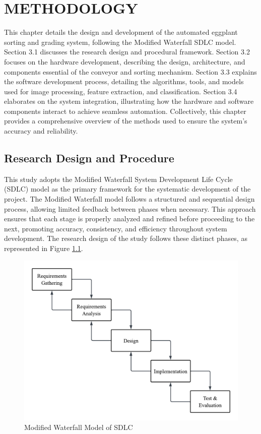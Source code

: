 
\chapter{METHODOLOGY}
{\baselineskip

This chapter details the design and development of the automated eggplant sorting and grading system, following the Modified Waterfall SDLC model. Section 3.1 discusses the research design and procedural framework. Section 3.2 focuses on the hardware development, describing the design, architecture, and components essential of the conveyor and sorting mechanism. Section 3.3 explains the software development process, detailing the algorithms, tools, and models used for image processing, feature extraction, and classification. Section 3.4 elaborates on the system integration, illustrating how the hardware and software components interact to achieve seamless automation. Collectively, this chapter provides a comprehensive overview of the methods used to ensure the system's accuracy and reliability.

\section{Research Design and Procedure}
This study adopts the Modified Waterfall System Development Life Cycle (SDLC) model as the primary framework for the systematic development of the project. The Modified Waterfall model follows a structured and sequential design process, allowing limited feedback between phases when necessary. This approach ensures that each stage is properly analyzed and refined before proceeding to the next, promoting accuracy, consistency, and efficiency throughout system development. The research design of the study follows these distinct phases, as represented in Figure \ref{fig:reserachdesign}.

\begin{figure}
	\centering
	\includegraphics[width=0.7\linewidth]{figures/research_design}
	\caption{Modified Waterfall Model of SDLC}
	\label{fig:reserachdesign}
\end{figure}

}
